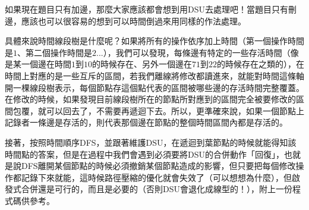 \documentclass[main.tex]{subfiles}
\begin{document}
如果現在題目只有加邊，那麼大家應該都會想到用DSU去處理吧！當題目只有刪邊，應該也可以很容易的想到可以時間倒過來用同樣的作法處理。

具體來說時間線段樹是什麼呢？如果將所有的操作依序加上時間（第一個操作時間是$1$、第二個操作時間是$2$...），我們可以發現，每條邊有特定的一些存活時間（像是某一個邊在時間$1$到$10$的時候存在、另外一個邊在$71$到$22$的時候存在之類的），在時間上對應的是一些互斥的區間，若我們離線將修改都讀進來，就能對時間這條軸開一棵線段樹表示，每個節點存這個點代表的區間被哪些邊的存活時間完整覆蓋。在修改的時候，如果發現目前線段樹所在的節點所對應到的區間完全被要修改的區間包覆，就可以回去了，不需要再遞迴下去。所以，更準確來說，如果一個節點上記錄者一條邊是存活的，則代表那個邊在節點的整個時間區間內都是存活的。

接著，按照時間順序DFS，並跟著維護DSU，在遞迴到葉節點的時候就能得知該時間點的答案，但是在過程中我們會遇到必須要將DSU的合併動作「回復」，也就是說DFS離開某個節點的時候必須撤銷某個節點造成的影響，但只要把每個修改操作都記錄下來就能，這時候路徑壓縮的優化就會失效了（可以想想為什麼），但啟發式合併還是可行的，而且是必要的（否則DSU會退化成線型的！），附上一份程式碼供參考。
\end{document}
